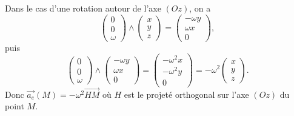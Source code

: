             \begin{example}
                Dans le cas d'une rotation autour de l'axe $(Oz)$, on a 
                \begin{equation}
                    \begin{pmatrix}
                        0\\0\\\omega
                    \end{pmatrix}\wedge\begin{pmatrix}
                        x\\y\\z
                    \end{pmatrix}=\begin{pmatrix}
                        -\omega y\\\omega x\\0
                    \end{pmatrix},
                \end{equation}
                puis
                \begin{equation}
                    \begin{pmatrix}
                        0\\0\\\omega
                    \end{pmatrix}\wedge\begin{pmatrix}
                        -\omega y\\\omega x\\0
                    \end{pmatrix}=\begin{pmatrix}
                        -\omega^{2}x\\-\omega^{2}y\\0
                    \end{pmatrix}=-\omega^{2}\begin{pmatrix}
                        x\\y\\z
                    \end{pmatrix}.
                \end{equation}
                Donc $\vec{a_e}(M)=-\omega^{2}\vec{HM}$ où $H$ est le projeté orthogonal sur l'axe $(Oz)$ du point $M$.
            \end{example}
